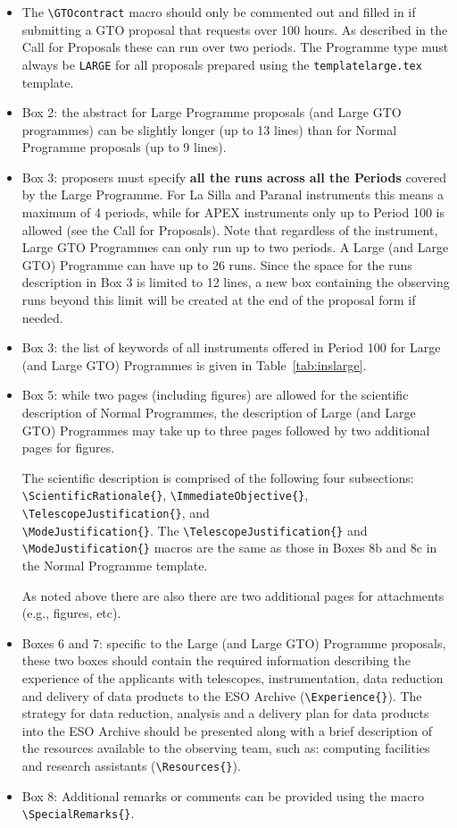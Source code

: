 \documentclass{article}
\begin{document}
\begin{itemize}
\item The \verb|\GTOcontract| macro should only be commented out and filled in if submitting 
a GTO proposal that requests over 100 hours. As described in the Call for Proposals these can run over two periods. The Programme type must always be {\tt LARGE} for all proposals
prepared using the {\tt templatelarge.tex} template. 
\item Box 2: the abstract for Large Programme proposals (and Large GTO programmes) can be
  slightly longer (up to 13 lines) than for Normal Programme proposals
  (up to 9 lines).  
\item Box 3: proposers must specify {\bf all the runs across all the
    Periods} covered by the Large Programme. 
For La Silla and Paranal instruments this means a maximum of 4 periods, while for APEX
instruments only up to Period 100 is allowed (see the Call for Proposals). 
Note that regardless of the instrument, Large GTO Programmes can only run up to two periods.
A Large (and Large GTO) Programme can have up to 26 runs. Since the space for the runs
  description in Box 3 is limited to 12 lines, a new box containing
  the observing runs beyond this limit will be created at the end of
  the proposal form if needed.
\item Box 3: the list of keywords of all instruments offered in Period
  100 for Large (and Large GTO) Programmes is given in
  Table~\ref{tab:inslarge}.
\item Box 5: while two pages (including figures) are allowed for the scientific
  description of Normal Programmes, the
  description of Large (and Large GTO) Programmes may take up to three pages followed by
  two additional pages for figures.

  The scientific description is comprised of the following four subsections:
  \verb|\ScientificRationale{}|,
  \verb|\ImmediateObjective{}|, \verb|\TelescopeJustification{}|, and\\
  \verb|\ModeJustification{}|.  
  The \verb|\TelescopeJustification{}| and \verb|\ModeJustification{}|
  macros are the same as those in Boxes 8b and 8c in the Normal Programme
  template.
  
  As noted above there are also there are two additional pages for
  attachments (e.g., figures, etc). 
\item Boxes 6 and 7: specific to the Large (and Large GTO) Programme proposals, these
  two boxes should contain the required information describing the
  experience of the applicants with telescopes, instrumentation, 
  data reduction  and delivery of data products to the ESO Archive 
  (\verb|\Experience{}|). The strategy for data reduction, analysis 
  and a delivery plan for data products into the ESO Archive should 
  be presented along with a brief description of the resources available
  to the observing team, such as: computing facilities and research
  assistants (\verb|\Resources{}|).
\item Box 8: Additional remarks or comments can be provided using
  the macro \verb|\SpecialRemarks{}|.
\end{itemize} 
\end{document}
